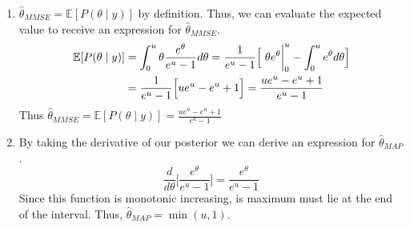 \documentclass[11pt]{article}
\begin{document}
\begin{enumerate}[label=\alph*)]
    \item $\hat{\theta}_{MMSE} = \mathbb{E}[P(\theta\mid y)]$ by definition. Thus, we can evaluate the expected value to receive an expression for $\hat{\theta}_{MMSE}$.
    \begin{align*}
        \mathbb{E}[P(\theta\mid y)] &= \int_0^u \theta \frac{e^\theta}{e^u-1} d\theta = \frac{1}{e^u-1}\Big[ \eval{\theta e^\theta}_{0}^{u} - \int_0^u e^\theta d\theta\Big] \\
        & = \frac{1}{e^u-1} \Big[ue^u - e^u+1\Big] = \frac{ue^u - e^u+1}{e^u-1}
    \end{align*}
    Thus $\hat{\theta}_{MMSE} = \mathbb{E}[P(\theta\mid y)] = \boxed{\frac{ue^u - e^u+1}{e^u-1}}$
    \item
        By taking the derivative of our posterior we can derive an expression for $\hat{\theta}_{MAP}$.
        \[
            \frac{d}{d\theta} \Big[\frac{e^\theta}{e^u-1}\Big] = \frac{e^\theta}{e^u-1}
        \]
        Since this function is monotonic increasing, is maximum must lie at the end of the interval. Thus, $\boxed{\hat{\theta}_{MAP} = \min(u,1)}$.
\end{enumerate}
\section{}
\end{document}
